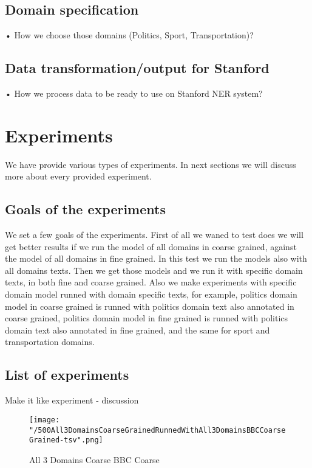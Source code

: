 \documentclass[thesis=M,english]{FITthesis}[2018/05/30]
\begin{document}
\section{Domain specification}
•	How we choose those domains (Politics, Sport, Transportation)?

\section{Data transformation/output for Stanford}
•	How we process data to be ready to use on Stanford NER system?


\chapter{Experiments}
We have provide various types of experiments. In next sections we will discuss more about every provided experiment.
\section{Goals of the experiments}
We set a few goals of the experiments. First of all we waned to test does we will get better results if we run the model of all domains in coarse grained, against the model of all domains in fine grained. In this test we run the models also with all domains texts. Then we get those models and we run it with specific domain texts, in both fine and coarse grained. Also we make experiments with specific domain model runned with domain specific texts, for example, politics domain model in coarse grained is runned with politics domain text also annotated in coarse grained, politics domain model in fine grained is runned with politics domain text also annotated in fine grained, and the same for sport and transportation domains.

\section{List of experiments}
Make it like experiment - discussion

	\begin{figure}[H]\centering
		\texttt{[image: "/500All3DomainsCoarseGrainedRunnedWithAll3DomainsBBCCoarseGrained-tsv".png]}
		\caption{All 3 Domains Coarse BBC Coarse}\label{}
	\end{figure}
\end{document}
